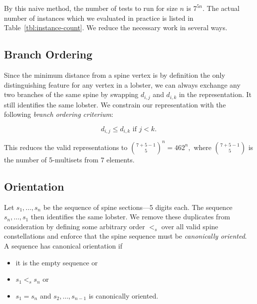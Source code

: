 By this naive method, the number of tests to run for size $n$ is $7^{5n}$. The actual number of instances which we evaluated in practice is listed in Table~\ref{tbl:instance-count}. We reduce the necessary work in several ways.

\subsection{Branch Ordering}

Since the minimum distance from a spine vertex is by definition the only distinguishing feature for any vertex in a lobster, we can always exchange any two branches of the same spine by swapping $d_{i,j}$ and $d_{i,k}$ in the representation. It still identifies the same lobster.
 We constrain our representation with the following \emph{branch ordering criterium}:

$$d_{i,j} \leq d_{i,k} \text{ if } j < k.$$

This reduces the valid representations to $\binom{7 + 5 - 1}{5}^n = 462^n,$ where $\binom{7 + 5 - 1}{5}$ is the number of 5-multisets from 7 elements.

\subsection{Orientation}

Let $s_1,\ldots,s_n$ be the sequence of spine sections---5 digits each. The sequence $s_n,\ldots,s_1$ then identifies the same lobster. We remove these duplicates from consideration by defining some arbitrary order $<_s$ over all valid spine constellations and enforce that the spine sequence must be \emph{canonically oriented}. A sequence has canonical orientation if

\begin{itemize}
    \item it is the empty sequence or
    \item $s_1 <_s s_n$ or
    \item $s_1 = s_n$ and $s_2, \ldots, s_{n-1}$ is canonically oriented.
\end{itemize}

